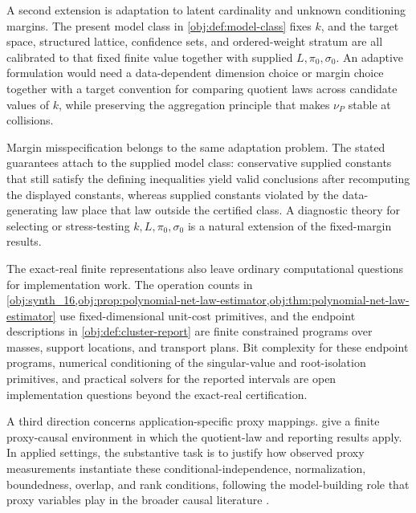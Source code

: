 \documentclass[11pt]{article}
\begin{document}
A second extension is adaptation to latent cardinality and unknown conditioning margins. The present model class in \cref{obj:def:model-class} fixes \(k\), and the target space, structured lattice, confidence sets, and ordered-weight stratum are all calibrated to that fixed finite value together with supplied \(L,\pi_0,\sigma_0\). An adaptive formulation would need a data-dependent dimension choice or margin choice together with a target convention for comparing quotient laws across candidate values of \(k\), while preserving the aggregation principle that makes \(\nu_P\) stable at collisions.

Margin misspecification belongs to the same adaptation problem. The stated guarantees attach to the supplied model class: conservative supplied constants that still satisfy the defining inequalities yield valid conclusions after recomputing the displayed constants, whereas supplied constants violated by the data-generating law place that law outside the certified class. A diagnostic theory for selecting or stress-testing \(k,L,\pi_0,\sigma_0\) is a natural extension of the fixed-margin results.

The exact-real finite representations also leave ordinary computational questions for implementation work. The operation counts in \cref{obj:synth_16,obj:prop:polynomial-net-law-estimator,obj:thm:polynomial-net-law-estimator} use fixed-dimensional unit-cost primitives, and the endpoint descriptions in \cref{obj:def:cluster-report} are finite constrained programs over masses, support locations, and transport plans. Bit complexity for these endpoint programs, numerical conditioning of the singular-value and root-isolation primitives, and practical solvers for the reported intervals are open implementation questions beyond the exact-real certification.

A third direction concerns application-specific proxy mappings.  give a finite proxy-causal environment in which the quotient-law and reporting results apply. In applied settings, the substantive task is to justify how observed proxy measurements instantiate these conditional-independence, normalization, boundedness, overlap, and rank conditions, following the model-building role that proxy variables play in the broader causal literature \citep{VirkMazaheriWu2026,VanAmsterdamEtAl2022}.
\end{document}
